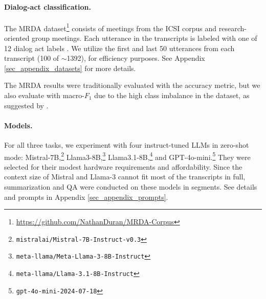\paragraph{Dialog-act classification.}
The MRDA dataset\footnote{\url{https://github.com/NathanDuran/MRDA-Corpus}} \citep{shriberg-etal-2004-icsi} consists of meetings from the ICSI corpus and research-oriented group meetings. Each utterance in the transcripts is labeled with one of 12 dialog act labels \citep{dhillon2004mrdaLabeling}. We utilize the first and last 50 utterances from each transcript (100 of $\sim$1392), for efficiency purposes. See Appendix \ref{sec_appendix_datasets} for more details.

The MRDA results were traditionally evaluated with the accuracy metric, but we also evaluate with macro-$F_1$ due to the high class imbalance in the dataset, as suggested by \citet{miah-etal-2023-hierarchical}.

\paragraph{Models.}
For all three tasks, we experiment with four instruct-tuned LLMs in zero-shot mode:
Mistral-7B,\footnote{\texttt{mistralai/Mistral-7B-Instruct-v0.3}} Llama3-8B,\footnote{\texttt{meta-llama/Meta-Llama-3-8B-Instruct}} Llama3.1-8B,\footnote{\texttt{meta-llama/Llama-3.1-8B-Instruct}} and GPT-4o-mini.\footnote{\texttt{gpt-4o-mini-2024-07-18}} 
They were selected for their modest hardware requirements and affordability.
Since the context size of Mistral and Llama-3 cannot fit most of the transcripts in full, summarization and QA were conducted on these models in segments.
See details and prompts in Appendix \ref{sec_appendix_prompts}.